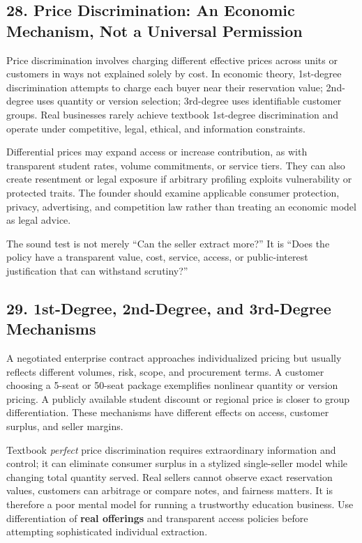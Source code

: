 \subsection*{28. Price Discrimination: An Economic Mechanism, Not a Universal Permission}

Price discrimination involves charging different effective prices across units or customers in ways not explained solely by cost. In economic theory, 1st-degree discrimination attempts to charge each buyer near their reservation value; 2nd-degree uses quantity or version selection; 3rd-degree uses identifiable customer groups. Real businesses rarely achieve textbook 1st-degree discrimination and operate under competitive, legal, ethical, and information constraints.

Differential prices may expand access or increase contribution, as with transparent student rates, volume commitments, or service tiers. They can also create resentment or legal exposure if arbitrary profiling exploits vulnerability or protected traits. The founder should examine applicable consumer protection, privacy, advertising, and competition law rather than treating an economic model as legal advice.

The sound test is not merely ``Can the seller extract more?'' It is ``Does the policy have a transparent value, cost, service, access, or public-interest justification that can withstand scrutiny?''

\subsection*{29. 1st-Degree, 2nd-Degree, and 3rd-Degree Mechanisms}

A negotiated enterprise contract approaches individualized pricing but usually reflects different volumes, risk, scope, and procurement terms. A customer choosing a 5-seat or 50-seat package exemplifies nonlinear quantity or version pricing. A publicly available student discount or regional price is closer to group differentiation. These mechanisms have different effects on access, customer surplus, and seller margins.

Textbook \emph{perfect} price discrimination requires extraordinary information and control; it can eliminate consumer surplus in a stylized single-seller model while changing total quantity served. Real sellers cannot observe exact reservation values, customers can arbitrage or compare notes, and fairness matters. It is therefore a poor mental model for running a trustworthy education business. Use differentiation of \textbf{real offerings} and transparent access policies before attempting sophisticated individual extraction.

